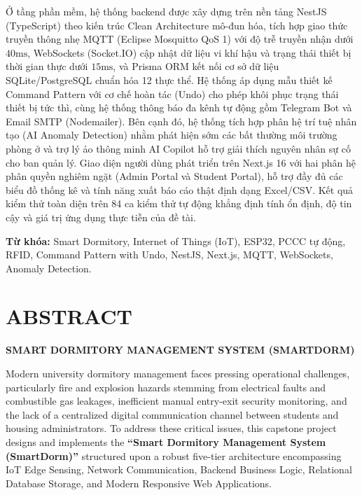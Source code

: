 Ở tầng phần mềm, hệ thống backend được xây dựng trên nền tảng NestJS (TypeScript) theo kiến trúc Clean Architecture mô-đun hóa, tích hợp giao thức truyền thông nhẹ MQTT (Eclipse Mosquitto QoS 1) với độ trễ truyền nhận dưới $40\text{ms}$, WebSockets (Socket.IO) cập nhật dữ liệu vi khí hậu và trạng thái thiết bị thời gian thực dưới $15\text{ms}$, và Prisma ORM kết nối cơ sở dữ liệu SQLite/PostgreSQL chuẩn hóa 12 thực thể. Hệ thống áp dụng mẫu thiết kế Command Pattern với cơ chế hoàn tác (Undo) cho phép khôi phục trạng thái thiết bị tức thì, cùng hệ thống thông báo đa kênh tự động gồm Telegram Bot và Email SMTP (Nodemailer). Bên cạnh đó, hệ thống tích hợp phân hệ trí tuệ nhân tạo (AI Anomaly Detection) nhằm phát hiện sớm các bất thường môi trường phòng ở và trợ lý ảo thông minh AI Copilot hỗ trợ giải thích nguyên nhân sự cố cho ban quản lý. Giao diện người dùng phát triển trên Next.js 16 với hai phân hệ phân quyền nghiêm ngặt (Admin Portal và Student Portal), hỗ trợ đầy đủ các biểu đồ thống kê và tính năng xuất báo cáo thật định dạng Excel/CSV. Kết quả kiểm thử toàn diện trên 84 ca kiểm thử tự động khẳng định tính ổn định, độ tin cậy và giá trị ứng dụng thực tiễn của đề tài.

\vspace{0.5cm}
\noindent \textbf{Từ khóa:} Smart Dormitory, Internet of Things (IoT), ESP32, PCCC tự động, RFID, Command Pattern with Undo, NestJS, Next.js, MQTT, WebSockets, Anomaly Detection.

\newpage

\chapter*{ABSTRACT}

\begin{center}
    {\large \bfseries SMART DORMITORY MANAGEMENT SYSTEM (SMARTDORM)}\\[0.5cm]
\end{center}

Modern university dormitory management faces pressing operational challenges, particularly fire and explosion hazards stemming from electrical faults and combustible gas leakages, inefficient manual entry-exit security monitoring, and the lack of a centralized digital communication channel between students and housing administrators. To address these critical issues, this capstone project designs and implements the \textbf{``Smart Dormitory Management System (SmartDorm)''} structured upon a robust five-tier architecture encompassing IoT Edge Sensing, Network Communication, Backend Business Logic, Relational Database Storage, and Modern Responsive Web Applications.

